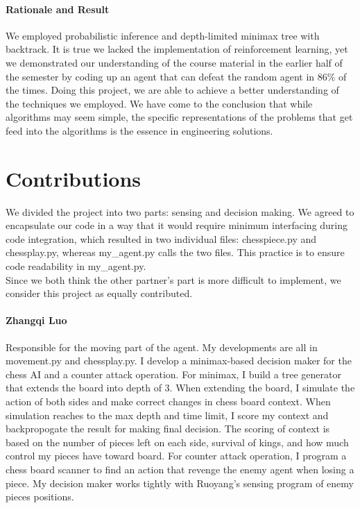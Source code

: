 \documentclass[11pt]{article}
\begin{document}
\paragraph{Rationale and Result}
We employed probabilistic inference and depth-limited minimax tree with backtrack. It is true we lacked the implementation of reinforcement learning, yet we demonstrated our understanding of the course material in the earlier half of the semester by coding up an agent that can defeat the random agent in 86\% of the times.
Doing this project, we are able to achieve a better understanding of the techniques we employed. We have come to the conclusion that while algorithms may seem simple, the specific representations of the problems that get feed into the algorithms is the essence in engineering solutions. 
\section*{Contributions}
We divided the project into two parts: sensing and decision making. We agreed to encapsulate our code in a way that it would require minimum interfacing during code integration, which resulted in two individual files: chesspiece.py and chessplay.py, whereas my\_agent.py calls the two files. This practice is to ensure code readability in my\_agent.py.\vspace{6pt}\\
Since we both think the other partner's part is more difficult to implement,
we consider this project as equally contributed.
\paragraph{Zhangqi Luo} Responsible for the moving part of the agent.  My developments are all in movement.py and chessplay.py. I develop a minimax-based decision maker for the chess AI and a counter attack operation. For minimax, I build a tree generator that extends the board into depth of 3. When extending the board, I simulate the action of both sides and make correct changes in chess board context. When simulation reaches to the max depth and time limit, I score my context and backpropogate the result for making final decision. The scoring of context is based on the number of pieces left on each side, survival of kings, and how much control my pieces have toward board. For counter attack operation, I program a chess board scanner to find an action that revenge the enemy agent when losing a piece. My decision maker works tightly with Ruoyang's sensing program of enemy pieces positions.
\end{document}
